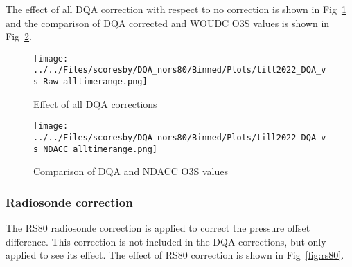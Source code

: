 %
The effect of all DQA correction with respect to no correction is shown in Fig~\ref{fig:dqa_all} and the comparison of DQA corrected and
WOUDC O3S values is shown in Fig~\ref{fig:fig_dqa_ndacc}.

                        \begin{figure}
        \centering
\texttt{[image: ../../Files/scoresby/DQA\_nors80/Binned/Plots/till2022\_DQA\_vs\_Raw\_alltimerange.png]}
    \caption{Effect of all DQA corrections}
            \label{fig:dqa_all}
    \end{figure}
%
                        \begin{figure}
        \centering
\texttt{[image: ../../Files/scoresby/DQA\_nors80/Binned/Plots/till2022\_DQA\_vs\_NDACC\_alltimerange.png]}
    \caption{Comparison of DQA and NDACC O3S values}
            \label{fig:fig_dqa_ndacc}
    \end{figure}
 \subsubsection{Radiosonde correction}
    The RS80 radiosonde correction is applied to correct the pressure offset difference.
    This correction is not included in the DQA corrections, but only applied to see its effect.
    The effect of RS80 correction is shown in Fig~\ref{fig:rs80}. \\

%

